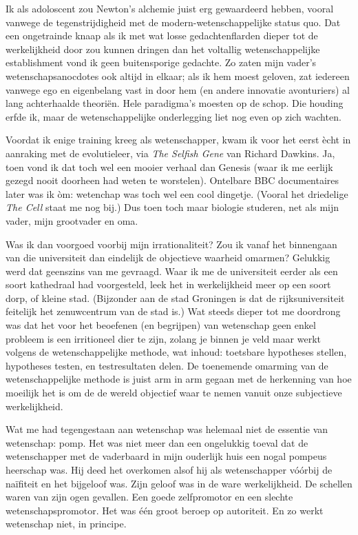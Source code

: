 \documentclass[12pt,a4paper]{article}
\begin{document}
Ik als adoloscent zou Newton's alchemie juist erg gewaardeerd hebben, vooral vanwege de tegenstrijdigheid met de modern-wetenschappelijke status quo. Dat een ongetrainde knaap als ik met wat losse gedachtenflarden dieper tot de werkelijkheid door zou kunnen dringen dan het voltallig wetenschappelijke establishment vond ik geen buitensporige gedachte. Zo zaten mijn vader's wetenschapsanocdotes ook altijd in elkaar; als ik hem moest geloven, zat iedereen vanwege ego en eigenbelang vast in door hem (en andere innovatie avonturiers) al lang achterhaalde theoriën. Hele paradigma's moesten op de schop. Die houding erfde ik, maar de wetenschappelijke onderlegging liet nog even op zich wachten.

Voordat ik enige training kreeg als wetenschapper, kwam ik voor het eerst ècht in aanraking met de evolutieleer, via \emph{The Selfish Gene} van Richard Dawkins. Ja, toen vond ik dat toch wel een mooier verhaal dan Genesis (waar ik me eerlijk gezegd nooit doorheen had weten te worstelen). Ontelbare BBC documentaires later was ik òm: wetenchap was toch wel een cool dingetje. (Vooral het driedelige \emph{The Cell} staat me nog bij.) Dus toen toch maar biologie studeren, net als mijn vader, mijn grootvader en oma.

Was ik dan voorgoed voorbij mijn irrationaliteit? Zou ik vanaf het binnengaan van die universiteit dan eindelijk de objectieve waarheid omarmen? Gelukkig werd dat geenszins van me gevraagd. Waar ik me de universiteit eerder als een soort kathedraal had voorgesteld, leek het in werkelijkheid meer op een soort dorp, of kleine stad. (Bijzonder aan de stad Groningen is dat de rijksuniversiteit feitelijk het zenuwcentrum van de stad is.) Wat steeds dieper tot me doordrong was dat het voor het beoefenen (en begrijpen) van wetenschap geen enkel probleem is een irritioneel dier te zijn, zolang je binnen je veld maar werkt volgens de wetenschappelijke methode, wat inhoud: toetsbare hypotheses stellen, hypotheses testen, en testresultaten delen. De toenemende omarming van de wetenschappelijke methode is juist arm in arm gegaan met de herkenning van hoe moeilijk het is om de de wereld objectief waar te nemen vanuit onze subjectieve werkelijkheid.

Wat me had tegengestaan aan wetenschap was helemaal niet de essentie van wetenschap: pomp. Het was niet meer dan een ongelukkig toeval dat de wetenschapper met de vaderbaard in mijn ouderlijk huis een nogal pompeus heerschap was. Hij deed het overkomen alsof hij als wetenschapper vóórbij de naïfiteit en het bijgeloof was. Zijn geloof was in de ware werkelijkheid. De schellen waren van zijn ogen gevallen. Een goede zelfpromotor en een slechte wetenschapspromotor. Het was één groot beroep op autoriteit. En zo werkt wetenschap niet, in principe.
\end{document}
